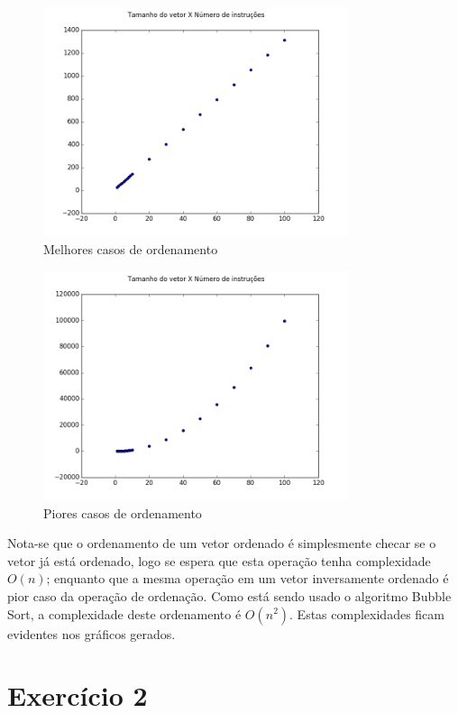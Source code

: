 \documentclass[12pt, a4paper, twoside]{article}
\begin{document}
\begin{figure}
    \centering
    \includegraphics[width=0.8\textwidth]{ex1/best.png}
    \caption{Melhores casos de ordenamento}
\end{figure}


\begin{figure}
    \centering
    \includegraphics[width=0.8\textwidth]{ex1/worst.png}
    \caption{Piores casos de ordenamento}
\end{figure}

Nota-se que o ordenamento de um vetor ordenado é simplesmente checar se o vetor já está ordenado, logo se espera que esta operação tenha complexidade $O(n)$; enquanto que a mesma operação em um vetor inversamente ordenado é pior caso da operação de ordenação. Como está sendo usado o algoritmo Bubble Sort, a complexidade deste ordenamento é $O(n^2)$. Estas complexidades ficam evidentes nos gráficos gerados.

\section{Exercício 2}
\end{document}
